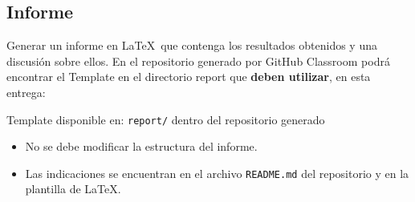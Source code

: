 \subsection{Informe} \label{subsec:report}
Generar un informe en \LaTeX\ que contenga los resultados obtenidos y una discusión sobre ellos. En el repositorio generado por GitHub Classroom podrá encontrar el Template en el directorio report que \textbf{deben utilizar}, en esta entrega:

\begin{mdframed}

\begin{center}
    
    Template disponible en: \texttt{report/} dentro del repositorio generado
        
\end{center}
\end{mdframed}

\begin{itemize}
    \item No se debe modificar la estructura del informe.
    \item Las indicaciones se encuentran en el archivo \texttt{README.md} del repositorio y en la plantilla de \LaTeX. 
\end{itemize}